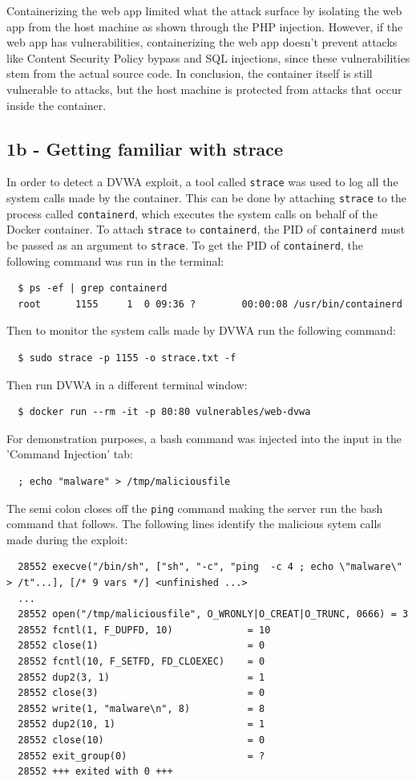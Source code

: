 \documentclass[11pt]{article}
\begin{document}
Containerizing the web app limited what the attack surface by isolating the web app from the host machine as shown through the PHP injection.
However, if the web app has vulnerabilities, containerizing the web app doesn't prevent attacks like Content Security Policy bypass and SQL injections,
since these vulnerabilities stem from the actual source code.
In conclusion, the container itself is still vulnerable to attacks, but the host machine is protected from attacks that occur inside the container.

\subsection*{1b - Getting familiar with strace}
In order to detect a DVWA exploit, a tool called \verb|strace| was used to log all the system calls made by the container.
This can be done by attaching \verb|strace| to the process called \verb|containerd|, which executes the system calls on behalf of the Docker container.
To attach \verb|strace| to \verb|containerd|, the PID of \verb|containerd| must be passed as an argument to \verb|strace|.
\noindent To get the PID of \verb|containerd|, the following command was run in the terminal:
\begin{verbatim}
  $ ps -ef | grep containerd
  root      1155     1  0 09:36 ?        00:00:08 /usr/bin/containerd
\end{verbatim}
\noindent Then to monitor the system calls made by DVWA run the following command:
\begin{verbatim}
  $ sudo strace -p 1155 -o strace.txt -f
\end{verbatim}
\noindent Then run DVWA in a different terminal window:
\begin{verbatim}
  $ docker run --rm -it -p 80:80 vulnerables/web-dvwa
\end{verbatim}

\noindent For demonstration purposes, a bash command was injected into the input in the 'Command Injection' tab:
\begin{verbatim}
  ; echo "malware" > /tmp/maliciousfile
\end{verbatim}

\noindent The semi colon closes off the \verb|ping| command making the server run the bash command that follows.
The following lines identify the malicious sytem calls made during the exploit:
\begin{verbatim}
  28552 execve("/bin/sh", ["sh", "-c", "ping  -c 4 ; echo \"malware\" > /t"...], [/* 9 vars */] <unfinished ...>
  ...
  28552 open("/tmp/maliciousfile", O_WRONLY|O_CREAT|O_TRUNC, 0666) = 3
  28552 fcntl(1, F_DUPFD, 10)             = 10
  28552 close(1)                          = 0
  28552 fcntl(10, F_SETFD, FD_CLOEXEC)    = 0
  28552 dup2(3, 1)                        = 1
  28552 close(3)                          = 0
  28552 write(1, "malware\n", 8)          = 8
  28552 dup2(10, 1)                       = 1
  28552 close(10)                         = 0
  28552 exit_group(0)                     = ?
  28552 +++ exited with 0 +++
\end{verbatim}
\end{document}

